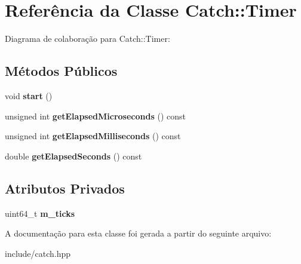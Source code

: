 \hypertarget{classCatch_1_1Timer}{}\section{Referência da Classe Catch\+:\+:Timer}
\label{classCatch_1_1Timer}


Diagrama de colaboração para Catch\+:\+:Timer\+:
\subsection*{Métodos Públicos}
\begin{DoxyCompactItemize}
\item 
void {\bfseries start} ()\hypertarget{classCatch_1_1Timer_a0a56e879e43f36c102bf9ea8b5fc8b72}{}\label{classCatch_1_1Timer_a0a56e879e43f36c102bf9ea8b5fc8b72}

\item 
unsigned int {\bfseries get\+Elapsed\+Microseconds} () const \hypertarget{classCatch_1_1Timer_a4b0062f169f7d3150b0e8073ab37890a}{}\label{classCatch_1_1Timer_a4b0062f169f7d3150b0e8073ab37890a}

\item 
unsigned int {\bfseries get\+Elapsed\+Milliseconds} () const \hypertarget{classCatch_1_1Timer_a4cf3f9fbee9c76e87d989d9bc6913b68}{}\label{classCatch_1_1Timer_a4cf3f9fbee9c76e87d989d9bc6913b68}

\item 
double {\bfseries get\+Elapsed\+Seconds} () const \hypertarget{classCatch_1_1Timer_a8500ef3481a9bf6ae81337972d9f95a3}{}\label{classCatch_1_1Timer_a8500ef3481a9bf6ae81337972d9f95a3}

\end{DoxyCompactItemize}
\subsection*{Atributos Privados}
\begin{DoxyCompactItemize}
\item 
uint64\+\_\+t {\bfseries m\+\_\+ticks}\hypertarget{classCatch_1_1Timer_a239da9023ebeaefe2973b4a7532fd324}{}\label{classCatch_1_1Timer_a239da9023ebeaefe2973b4a7532fd324}

\end{DoxyCompactItemize}


A documentação para esta classe foi gerada a partir do seguinte arquivo\+:\begin{DoxyCompactItemize}
\item 
include/catch.\+hpp\end{DoxyCompactItemize}
